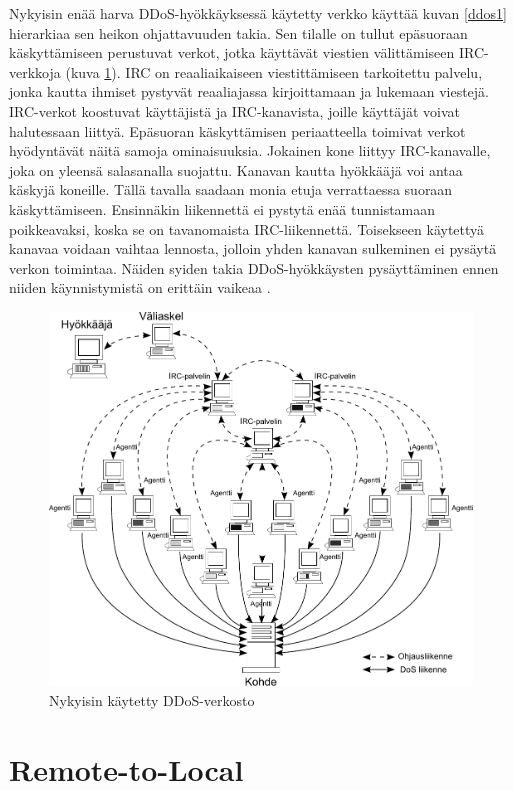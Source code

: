 \newpage
Nykyisin enää harva DDoS-hyökkäyksessä käytetty verkko käyttää kuvan
\ref{ddos1} hierarkiaa sen heikon ohjattavuuden takia. Sen tilalle
on tullut epäsuoraan käskyttämiseen perustuvat verkot, jotka käyttävät
viestien välittämiseen IRC-verkkoja (kuva \ref{ddos2}). IRC on
reaaliaikaiseen viestittämiseen tarkoitettu palvelu, jonka kautta
ihmiset pystyvät reaaliajassa kirjoittamaan ja lukemaan
viestejä. IRC-verkot koostuvat käyttäjistä ja IRC-kanavista, joille
käyttäjät voivat halutessaan liittyä. Epäsuoran käskyttämisen
periaatteella toimivat verkot hyödyntävät näitä samoja
ominaisuuksia. Jokainen kone liittyy IRC-kanavalle, joka on yleensä
salasanalla suojattu. Kanavan kautta hyökkääjä voi antaa käskyjä
koneille. Tällä tavalla saadaan monia etuja verrattaessa suoraan
käskyttämiseen.  Ensinnäkin liikennettä ei pystytä enää tunnistamaan
poikkeavaksi, koska se on tavanomaista IRC-liikennettä. Toisekseen
käytettyä kanavaa voidaan vaihtaa lennosta, jolloin yhden kanavan
sulkeminen ei pysäytä verkon toimintaa. Näiden syiden takia
DDoS-hyökkäysten pysäyttäminen ennen niiden käynnistymistä on erittäin
vaikeaa \cite{DDOS}.

\begin{figure}[h]
\centering
\includegraphics[width=12cm]{pics/ddos_uusi.pdf}
\caption{Nykyisin käytetty DDoS-verkosto}
\label{ddos2}
\end{figure}

\section{Remote-to-Local}

